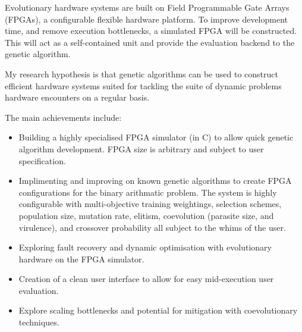 Evolutionary hardware systems are built on Field Programmable Gate Arrays (FPGAs),
a configurable flexible hardware platform.
To improve development
time, and remove execution bottlenecks, a simulated FPGA will be constructed.
This will act as a self-contained unit and provide the evaluation backend to the genetic algorithm.

My research hypothesis is that genetic algorithms can be used to construct
efficient hardware systems suited for tackling the suite of dynamic problems
hardware encounters on a regular basis.

The main achievements include:
\begin{itemize}
	\item Building a highly specialised FPGA simulator (in C) to allow quick
		genetic algorithm development. FPGA size is arbitrary and subject to
		user specification.
	\item Implimenting and improving on known genetic algorithms to
		create FPGA configurations for the binary arithmatic problem. The system is
		highly configurable with multi-objective training weightings, selection schemes,
		population size, mutation rate, elitism, coevolution (parasite size, and virulence),
		and crossover probability all subject to the whims of the user.
	\item Exploring fault recovery and dynamic optimisation with evolutionary
		hardware on the FPGA simulator.
	\item Creation of a clean user interface to allow for easy mid-execution user
		evaluation.
	\item Explore scaling bottlenecks and potential for mitigation with coevolutionary
		techniques.
\end{itemize}
